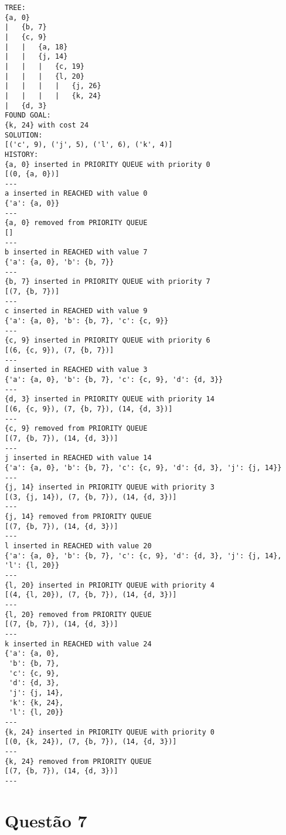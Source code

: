 \documentclass{article}
\begin{document}
\begin{verbatim}
TREE:
{a, 0}
|   {b, 7}
|   {c, 9}
|   |   {a, 18}
|   |   {j, 14}
|   |   |   {c, 19}
|   |   |   {l, 20}
|   |   |   |   {j, 26}
|   |   |   |   {k, 24}
|   {d, 3}
FOUND GOAL:
{k, 24} with cost 24
SOLUTION:
[('c', 9), ('j', 5), ('l', 6), ('k', 4)]
HISTORY:
{a, 0} inserted in PRIORITY QUEUE with priority 0
[(0, {a, 0})]
---
a inserted in REACHED with value 0
{'a': {a, 0}}
---
{a, 0} removed from PRIORITY QUEUE
[]
---
b inserted in REACHED with value 7
{'a': {a, 0}, 'b': {b, 7}}
---
{b, 7} inserted in PRIORITY QUEUE with priority 7
[(7, {b, 7})]
---
c inserted in REACHED with value 9
{'a': {a, 0}, 'b': {b, 7}, 'c': {c, 9}}
---
{c, 9} inserted in PRIORITY QUEUE with priority 6
[(6, {c, 9}), (7, {b, 7})]
---
d inserted in REACHED with value 3
{'a': {a, 0}, 'b': {b, 7}, 'c': {c, 9}, 'd': {d, 3}}
---
{d, 3} inserted in PRIORITY QUEUE with priority 14
[(6, {c, 9}), (7, {b, 7}), (14, {d, 3})]
---
{c, 9} removed from PRIORITY QUEUE
[(7, {b, 7}), (14, {d, 3})]
---
j inserted in REACHED with value 14
{'a': {a, 0}, 'b': {b, 7}, 'c': {c, 9}, 'd': {d, 3}, 'j': {j, 14}}
---
{j, 14} inserted in PRIORITY QUEUE with priority 3
[(3, {j, 14}), (7, {b, 7}), (14, {d, 3})]
---
{j, 14} removed from PRIORITY QUEUE
[(7, {b, 7}), (14, {d, 3})]
---
l inserted in REACHED with value 20
{'a': {a, 0}, 'b': {b, 7}, 'c': {c, 9}, 'd': {d, 3}, 'j': {j, 14}, 'l': {l, 20}}
---
{l, 20} inserted in PRIORITY QUEUE with priority 4
[(4, {l, 20}), (7, {b, 7}), (14, {d, 3})]
---
{l, 20} removed from PRIORITY QUEUE
[(7, {b, 7}), (14, {d, 3})]
---
k inserted in REACHED with value 24
{'a': {a, 0},
 'b': {b, 7},
 'c': {c, 9},
 'd': {d, 3},
 'j': {j, 14},
 'k': {k, 24},
 'l': {l, 20}}
---
{k, 24} inserted in PRIORITY QUEUE with priority 0
[(0, {k, 24}), (7, {b, 7}), (14, {d, 3})]
---
{k, 24} removed from PRIORITY QUEUE
[(7, {b, 7}), (14, {d, 3})]
---
\end{verbatim}

\newpage

\section{Questão 7}
\end{document}
